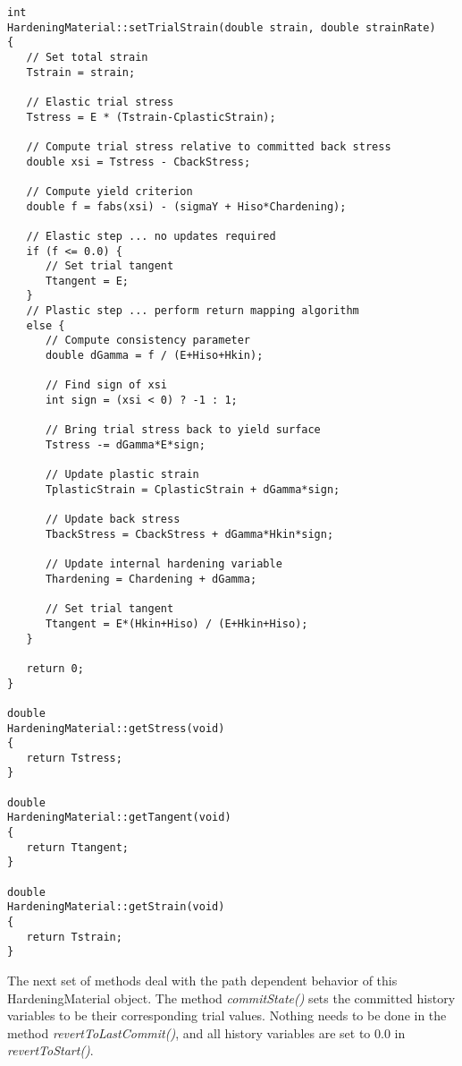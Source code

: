 \documentclass[12pt]{article}
\begin{document}
{\sf\small
\begin{verbatim}
int 
HardeningMaterial::setTrialStrain(double strain, double strainRate)
{
   // Set total strain
   Tstrain = strain;
    
   // Elastic trial stress
   Tstress = E * (Tstrain-CplasticStrain);
    
   // Compute trial stress relative to committed back stress
   double xsi = Tstress - CbackStress;

   // Compute yield criterion
   double f = fabs(xsi) - (sigmaY + Hiso*Chardening);
    
   // Elastic step ... no updates required
   if (f <= 0.0) {
      // Set trial tangent
      Ttangent = E;
   }
   // Plastic step ... perform return mapping algorithm
   else {
      // Compute consistency parameter
      double dGamma = f / (E+Hiso+Hkin);
   
      // Find sign of xsi
      int sign = (xsi < 0) ? -1 : 1;

      // Bring trial stress back to yield surface
      Tstress -= dGamma*E*sign;
	
      // Update plastic strain
      TplasticStrain = CplasticStrain + dGamma*sign;
	
      // Update back stress
      TbackStress = CbackStress + dGamma*Hkin*sign;
	
      // Update internal hardening variable
      Thardening = Chardening + dGamma;
	
      // Set trial tangent
      Ttangent = E*(Hkin+Hiso) / (E+Hkin+Hiso);
   }

   return 0;
}

double 
HardeningMaterial::getStress(void)
{
   return Tstress;
}

double 
HardeningMaterial::getTangent(void)
{
   return Ttangent;
}

double 
HardeningMaterial::getStrain(void)
{
   return Tstrain;
}
\end{verbatim}
}

\noindent The next set of methods deal with the path dependent behavior of this
HardeningMaterial object. The method {\em commitState()} sets the committed history variables
to be their corresponding trial values. Nothing needs to be done in the method
{\em revertToLastCommit()}, and all history variables are set to $0.0$ in
{\em revertToStart()}.
\end{document}
